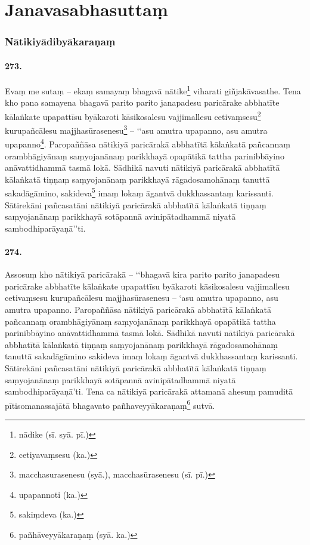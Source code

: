 \section{Janavasabhasuttaṃ}

\subsubsection{Nātikiyādibyākaraṇaṃ}

\paragraph{273.} Evaṃ me sutaṃ – ekaṃ samayaṃ bhagavā nātike\footnote{nādike (sī. syā. pī.)} viharati giñjakāvasathe. Tena kho pana samayena bhagavā parito parito janapadesu paricārake abbhatīte kālaṅkate upapattīsu byākaroti kāsikosalesu vajjimallesu cetivaṃsesu\footnote{cetiyavaṃsesu (ka.)} kurupañcālesu majjhasūrasenesu\footnote{macchasurasenesu (syā.), macchasūrasenesu (sī. pī.)} – ‘‘asu amutra upapanno, asu amutra upapanno\footnote{upapannoti (ka.)}. Paropaññāsa nātikiyā paricārakā abbhatītā kālaṅkatā pañcannaṃ orambhāgiyānaṃ saṃyojanānaṃ parikkhayā opapātikā tattha parinibbāyino anāvattidhammā tasmā lokā. Sādhikā navuti nātikiyā paricārakā abbhatītā kālaṅkatā tiṇṇaṃ saṃyojanānaṃ parikkhayā rāgadosamohānaṃ tanuttā sakadāgāmino, sakideva\footnote{sakiṃdeva (ka.)} imaṃ lokaṃ āgantvā dukkhassantaṃ karissanti. Sātirekāni pañcasatāni nātikiyā paricārakā abbhatītā kālaṅkatā tiṇṇaṃ saṃyojanānaṃ parikkhayā sotāpannā avinipātadhammā niyatā sambodhiparāyaṇā’’ti.

\paragraph{274.} Assosuṃ kho nātikiyā paricārakā – ‘‘bhagavā kira parito parito janapadesu paricārake abbhatīte kālaṅkate upapattīsu byākaroti kāsikosalesu vajjimallesu cetivaṃsesu kurupañcālesu majjhasūrasenesu – ‘asu amutra upapanno, asu amutra upapanno. Paropaññāsa nātikiyā paricārakā abbhatītā kālaṅkatā pañcannaṃ orambhāgiyānaṃ saṃyojanānaṃ parikkhayā opapātikā tattha parinibbāyino anāvattidhammā tasmā lokā. Sādhikā navuti nātikiyā paricārakā abbhatītā kālaṅkatā tiṇṇaṃ saṃyojanānaṃ parikkhayā rāgadosamohānaṃ tanuttā sakadāgāmino sakideva imaṃ lokaṃ āgantvā dukkhassantaṃ karissanti. Sātirekāni pañcasatāni nātikiyā paricārakā abbhatītā kālaṅkatā tiṇṇaṃ saṃyojanānaṃ parikkhayā sotāpannā avinipātadhammā niyatā sambodhiparāyaṇā’ti. Tena ca nātikiyā paricārakā attamanā ahesuṃ pamuditā pītisomanassajātā bhagavato pañhaveyyākaraṇaṃ\footnote{pañhāveyyākaraṇaṃ (syā. ka.)} sutvā.

